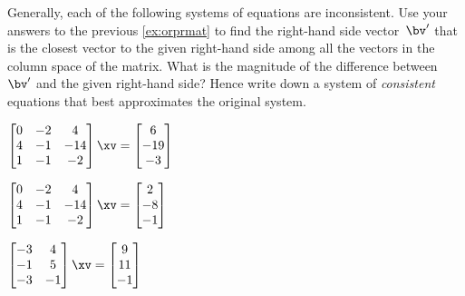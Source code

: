 \begin{exercise} \label{ex:aicebcb} 
Generally, each of the following systems of equations are inconsistent.
Use your answers to the previous \autoref{ex:orprmat} to find the right-hand side vector~\(\bv'\) that is the closest vector to the given right-hand side among all the vectors in the column space of the matrix.  
What is the magnitude of the difference between~\(\bv'\) and the given right-hand side?
Hence write down a system of \emph{consistent} equations that best approximates the original system.
\begin{parts}
\item \(\begin{bmatrix} 0&-2&4
\\4&-1&-14
\\1&-1&-2 \end{bmatrix}\xv
=\begin{bmatrix} 6\\-19\\-3 \end{bmatrix}\)

\item \(\begin{bmatrix} 0&-2&4
\\4&-1&-14
\\1&-1&-2 \end{bmatrix}\xv
=\begin{bmatrix} 2\\-8\\-1 \end{bmatrix}\)

\item \(\begin{bmatrix} -3&4
\\-1&5
\\-3&-1 \end{bmatrix}\xv
=\begin{bmatrix} 9\\11\\-1 \end{bmatrix}\)


\end{parts}
\end{exercise}
